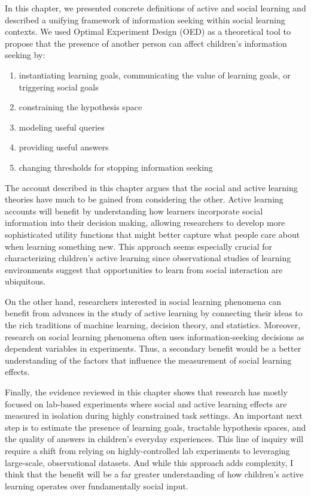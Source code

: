 \documentclass[oneside]{report}
\begin{document}
In this chapter, we presented concrete definitions of active and social
learning and described a unifying framework of information seeking
within social learning contexts. We used Optimal Experiment Design (OED)
as a theoretical tool to propose that the presence of another person can
affect children's information seeking by:
\begin{enumerate}
\def\labelenumi{\arabic{enumi}.}
\tightlist
\item
  instantiating learning goals, communicating the value of learning
  goals, or triggering social goals
\item
  constraining the hypothesis space
\item
  modeling useful queries
\item
  providing useful answers
\item
  changing thresholds for stopping information seeking
\end{enumerate}
\noindent
The account described in this chapter argues that the social and active
learning theories have much to be gained from considering the other.
Active learning accounts will benefit by understanding how learners
incorporate social information into their decision making, allowing
researchers to develop more sophisticated utility functions that might
better capture what people care about when learning something new. This
approach seems especially crucial for characterizing children's active
learning since observational studies of learning environments suggest
that opportunities to learn from social interaction are ubiquitous.

On the other hand, researchers interested in social learning phenomena
can benefit from advances in the study of active learning by connecting
their ideas to the rich traditions of machine learning, decision theory,
and statistics. Moreover, research on social learning phenomena often
uses information-seeking decisions as dependent variables in
experiments. Thus, a secondary benefit would be a better understanding
of the factors that influence the measurement of social learning
effects.

Finally, the evidence reviewed in this chapter shows that research has
mostly focused on lab-based experiments where social and active learning
effects are measured in isolation during highly constrained task
settings. An important next step is to estimate the presence of learning
goals, tractable hypothesis spaces, and the quality of answers in
children's everyday experiences. This line of inquiry will require a
shift from relying on highly-controlled lab experiments to leveraging
large-scale, observational datasets. And while this approach adds
complexity, I think that the benefit will be a far greater understanding
of how children's active learning operates over fundamentally social
input.
\end{document}
